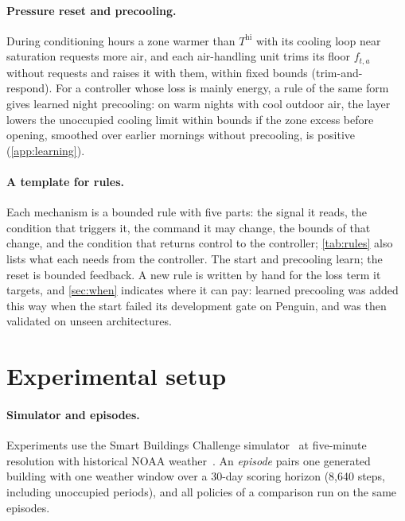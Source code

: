 \documentclass{article}
\begin{document}
\paragraph{Pressure reset and precooling.}
During conditioning hours a zone warmer than $T^{\mathrm{hi}}$ with its cooling loop near saturation requests more air, and each
air-handling unit trims its floor $f_{t,a}$ without requests and raises it with them, within fixed bounds
(trim-and-respond). For a controller whose loss is mainly energy, a rule of the same form gives
learned night precooling: on warm nights with cool outdoor air, the layer lowers the unoccupied cooling limit within bounds
if the zone excess before opening, smoothed over earlier mornings without precooling, is positive (\cref{app:learning}).

\paragraph{A template for rules.}
Each mechanism is a bounded rule with five parts: the signal it reads, the condition that triggers it, the command it may
change, the bounds of that change, and the condition that returns control to the controller; \cref{tab:rules} also lists
what each needs from the controller. The start and precooling learn; the reset is bounded feedback. A new rule is written by hand for the loss term it targets, and \cref{sec:when} indicates
where it can pay: learned precooling was added this way when the start failed its development gate on Penguin,
and was then validated on unseen architectures.

\section{Experimental setup}\label{sec:setup}
\paragraph{Simulator and episodes.}
Experiments use the Smart Buildings Challenge simulator~\cite{goldfeder2024suite,goldfeder2026challenge} at
five-minute resolution with historical NOAA weather~\cite{smith2011isd}. An \emph{episode} pairs one generated building
with one weather window over a 30-day scoring horizon (8,640 steps, including unoccupied periods), and all policies of a
comparison run on the same episodes.
\end{document}
